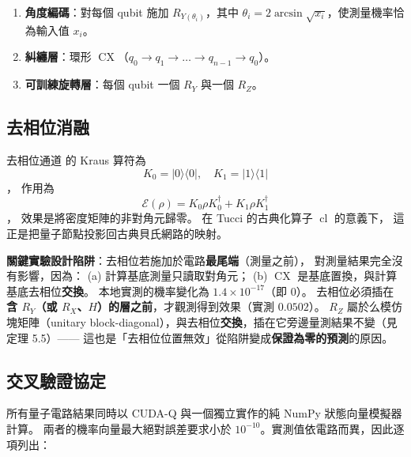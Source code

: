 \documentclass[11pt,a4paper]{ctexart}
\begin{document}
\begin{enumerate}
\item
  \textbf{角度編碼}：對每個 qubit 施加
  \(R_{Y\left( \theta_{i} \right)}\)，其中
  \(\theta_{i} = 2\arcsin\sqrt{x_{i}}\)，使測量機率恰為輸入值
  \(x_{i}\)。
\item
  \textbf{糾纏層}：環形
  \(\operatorname{CX}\)（\(q_{0} \rightarrow q_{1} \rightarrow \ldots \rightarrow q_{n - 1} \rightarrow q_{0}\)）。
\item
  \textbf{可訓練旋轉層}：每個 qubit 一個 \(R_{Y}\) 與一個 \(R_{Z}\)。
\end{enumerate}

\subsection{去相位消融}

去相位通道 \cite{nielsen2010} 的 Kraus 算符為
\[K_{0} = |0\rangle\langle 0|,\quad K_{1} = |1\rangle\langle 1|\]，
作用為
\[\mathcal{E}(\rho) = K_{0}\rho K_{0}^{\dagger} + K_{1}\rho K_{1}^{\dagger}\]，
效果是將密度矩陣的非對角元歸零。 在 Tucci 的古典化算子
\(\operatorname{cl}\) \cite{tucci2012} 的意義下，
這正是把量子節點投影回古典貝氏網路的映射。

\textbf{關鍵實驗設計陷阱}：去相位若施加於電路\textbf{最尾端}（測量之前），
對測量結果完全沒有影響，因為： (a) 計算基底測量只讀取對角元； (b)
\(\operatorname{CX}\) 是基底置換，與計算基底去相位\textbf{交換}。
本地實測的機率變化為 \(1.4 \times 10^{- 17}\)（即 \(0\)）。
去相位必須插在\textbf{含 \(R_{Y}\)（或
\(R_{X}\)、\(H\)）的層之前}，才觀測得到效果（實測 \(0.0502\)）。
\(R_{Z}\) 屬於么模仿塊矩陣（unitary
block-diagonal），與去相位\textbf{交換}，插在它旁邊量測結果不變（見定理
5.5）------
這也是「去相位位置無效」從陷阱變成\textbf{保證為零的預測}的原因。

\subsection{交叉驗證協定}

所有量子電路結果同時以 CUDA-Q 與一個獨立實作的純 NumPy
狀態向量模擬器計算。 兩者的機率向量最大絕對誤差要求小於
\(10^{- 10}\)。實測值依電路而異，因此逐項列出：
\end{document}
